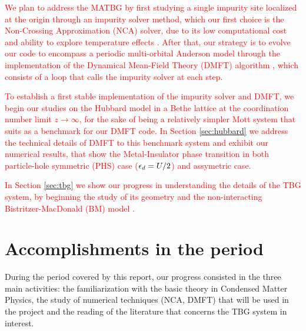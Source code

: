 \documentclass[12pt]{report}
\newcommand{\ALERT}[1]{\textcolor{red}{#1}}
\begin{document}
\ALERT{We plan to address the MATBG by first studying a single impurity site localized at the origin through an impurity solver method, which our first choice is the Non-Crossing Approximation (NCA) solver, due to its low computational cost and ability to explore temperature effects \cite{impurity-solvers}. After that, our strategy is to evolve our code to encompass a periodic multi-orbital Anderson model through the implementation of the Dynamical Mean-Field Theory (DMFT) algorithm \cite{georges1996}, which consists of a loop that calls the impurity solver at each step.}

\ALERT{To establish a first stable implementation of the impurity solver and DMFT, we begin our studies on the Hubbard model in a Bethe lattice at the coordination number limit $z\to\infty$, for the sake of being a relatively simpler Mott system that suits as a benchmark for our DMFT code. In Section \ref{sec:hubbard} we address the technical details of DMFT to this benchmark system and exhibit our numerical results, that show the Metal-Insulator phase transition in both particle-hole symmetric (PHS) case ($\epsilon_d = U/2$) and assymetric case.}

\ALERT{In Section \ref{sec:tbg} we show our progress in understanding the details of the TBG system, by beginning the study of its geometry \cite{handbook2019} and the non-interacting Bistritzer-MacDonald (BM) model \cite{macdonald2011}.}

\chapter{Accomplishments in the period} \label{chp:accomplishments}

During the period covered by this report, our progress consisted in the three main activities: the familiarization with the basic theory in Condensed Matter Physics, the study of numerical techniques (NCA, DMFT) that will be used in the project and the reading of the literature that concerns the TBG system in interest.
\end{document}
